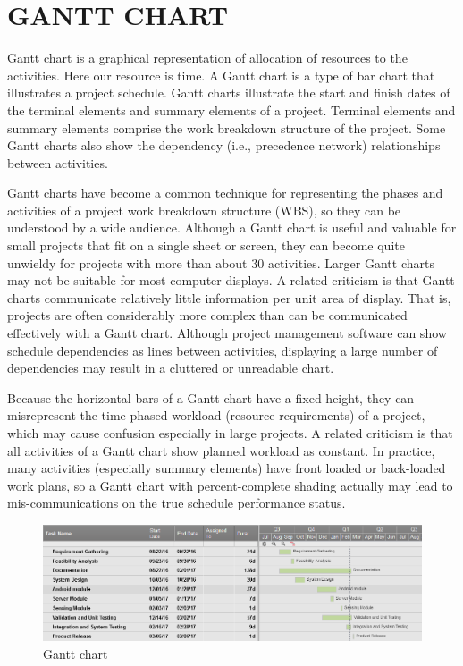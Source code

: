 \documentclass[12pt,a4paper,oneside]{report}
\begin{document}
{\section{GANTT CHART} 
\par Gantt chart is a graphical representation of allocation of resources to the activities. Here
our resource is time. A Gantt chart is a type of bar chart that illustrates a project schedule.
Gantt charts illustrate the start and finish dates of the terminal elements and summary elements
of a project. Terminal elements and summary elements comprise the work breakdown structure
of the project. Some Gantt charts also show the dependency (i.e., precedence network)
relationships between activities.
\par Gantt charts have become a common technique for representing the phases and activities
of a project work breakdown structure (WBS), so they can be understood by a wide audience.
Although a Gantt chart is useful and valuable for small projects that fit on a single sheet or
screen, they can become quite unwieldy for projects with more than about 30 activities. Larger
Gantt charts may not be suitable for most computer displays. A related criticism is that Gantt
charts communicate relatively little information per unit area of display. That is, projects are
often considerably more complex than can be communicated effectively with a Gantt chart.
Although project management software can show schedule dependencies as lines between activities,
displaying a large number of dependencies may result in a cluttered or unreadable
chart.
\par Because the horizontal bars of a Gantt chart have a fixed height, they can misrepresent
the time-phased workload (resource requirements) of a project, which may cause confusion especially
in large projects. A related criticism is that all activities of a Gantt chart show planned
workload as constant. In practice, many activities (especially summary elements) have front loaded
or back-loaded work plans, so a Gantt chart with percent-complete shading actually may
lead to mis-communications on the true schedule performance status.
\begin{figure}[h]
\begin{center}
\includegraphics[scale=.6]{gantt.png}
\caption{Gantt chart}
\label{Gantt chart}
\end{center}
\end{figure}

}
\end{document}

